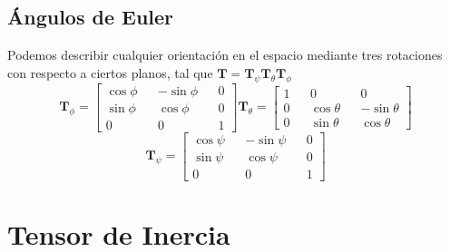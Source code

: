 \subsection{Ángulos de Euler}
\begin{marginfigure}[2pt]
    \def\svgwidth{5.5 cm}
    \hspace{-50pt}
    \normalsize
	
    \vspace{-30pt}
\end{marginfigure}
Podemos describir cualquier orientación en el espacio mediante tres rotaciones con respecto a ciertos planos, tal que $\mathbf{T} = \mathbf{T}_\psi \mathbf{T}_\theta \mathbf{T}_\phi$
\[\mathbf{T}_\phi = \left[\begin{matrix}
    \cos\phi && -\sin\phi&& 0\\
    \sin\phi && \cos\phi && 0\\
    0 && 0 && 1
\end{matrix}\right]
\mathbf{T}_\theta = \left[\begin{matrix}
    1 && 0 &&0 \\
    0&& \cos\theta&& - \sin\theta\\
    0&& \sin\theta&& \cos\theta
\end{matrix}\right]\]
\[\mathbf{T}_\psi = \left[\begin{matrix}
    \cos\psi && -\sin\psi&& 0\\
    \sin\psi && \cos\psi && 0\\
    0 && 0 && 1
\end{matrix}\right]\]
\vspace{-15pt}
\section{Tensor de Inercia}
\vspace{-15pt}
